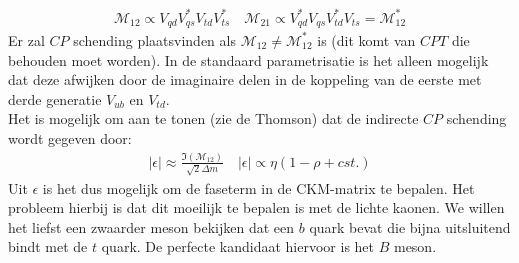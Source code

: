 \documentclass[../main.tex]{subfiles}
\begin{document}
\begin{minipage}[c]{0.5\textwidth}
    \begin{center}
    \end{center}
\end{minipage}
\begin{equation}
    \begin{aligned}
        \label{eq:kaon_osc_tijd_inv}
        \mathcal{M}_{12} \propto V_{q d} V_{q s}^{*} V_{t d} V_{t s}^{*} \quad \mathcal{M}_{21} \propto V_{q d}^{*} V_{q s} V_{t d}^{*} V_{t s}=\mathcal{M}_{12}^{*}
    \end{aligned}
\end{equation}
Er zal $CP$ schending plaatsvinden als $\mathcal{M}_{12} \neq \mathcal{M}_{12}^{*}$ is (dit komt van $CPT$ die behouden moet worden). In de standaard parametrisatie is het alleen mogelijk dat deze afwijken door de imaginaire delen in de koppeling van de eerste met derde generatie $V_{u b}$ en $V_{t d}$.\\
Het is mogelijk om aan te tonen (zie de Thomson) dat de indirecte $CP$ schending wordt gegeven door:
\begin{equation}
    \begin{aligned}
        \label{eq:direct_cp_viol_kaon}
        |\epsilon| \approx \frac{\Im\left(\mathcal{M}_{12}\right)}{\sqrt{2} \Delta m} \quad|\epsilon| \propto \eta(1-\rho+c s t .)
    \end{aligned}
\end{equation}
Uit $\epsilon$ is het dus mogelijk om de faseterm in de CKM-matrix te bepalen. Het probleem hierbij is dat dit moeilijk te bepalen is met de lichte kaonen. We willen het liefst een zwaarder meson bekijken dat een $b$ quark bevat die bijna uitsluitend bindt met de $t$ quark. De perfecte kandidaat hiervoor is het $B$ meson.
\end{document}
